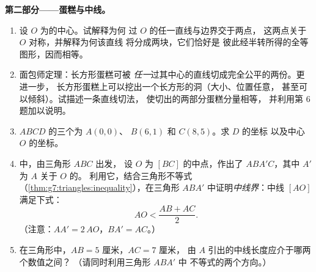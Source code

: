 \begin{problem}
\medskip
\noindent\textbf{第二部分——蛋糕与中线。}
\begin{enumerate}[resume]
  \item 设 $O$ 为的中心。试解释为何
        过 $O$ 的任一直线与边界交于两点，
        这两点关于 $O$ 对称，并解释为何该直线
        将分成两块，它们恰好是
        彼此经半转所得的全等图形，因而相等。
  \item 面包师定理：长方形蛋糕可被
        \emph{任一}过其中心的直线切成完全公平的两份。更进一步，
        长方形蛋糕上可以挖出一个长方形的洞（大小、位置任意，
        甚至可以倾斜）。试描述一条直线切法，
        使切出的两部分蛋糕分量相等，
        并利用第 6 题加以说明。
  \item {} $ABCD$ 的三个为 $A(0, 0)$、
        $B(6, 1)$ 和 $C(8, 5)$。求 $D$ 的坐标
        以及中心 $O$ 的坐标。
  \item {}中，由三角形 $ABC$ 出发，
        设 $O$ 为 $[BC]$ 的中点，作出了
        $ABA'C$，其中 $A'$ 为 $A$ 关于 $O$ 的。
        利用它，结合三角形不等式
        （\cref{thm:g7:triangles:inequality}），在三角形
        $ABA'$ 中证明\emph{中线界}：中线
        $[AO]$ 满足下式：
        \[
        AO < \frac{AB + AC}{2} .
        \]
        （注意：$AA' = 2\,AO$，$BA' = AC$。）
  \item 在三角形中，$AB = 5$ 厘米，$AC = 7$ 厘米，
        由 $A$ 引出的中线长度应介于哪两个数值之间？
        （请同时利用三角形 $ABA'$ 中
        不等式的两个方向。）
\end{enumerate}


\end{problem}
